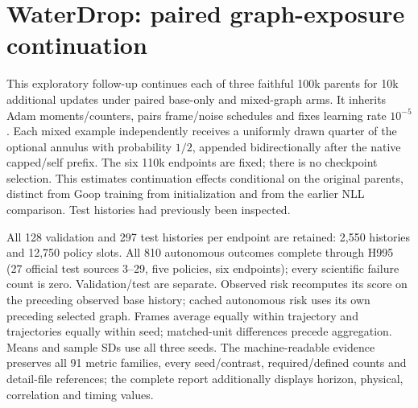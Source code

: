 \section{WaterDrop: paired graph-exposure continuation}
\label{sec:waterdrop-110k-exposure}
This exploratory follow-up continues each of three faithful 100k parents for 10k additional updates under paired base-only and mixed-graph arms. It inherits Adam moments/counters, pairs frame/noise schedules and fixes learning rate $10^{-5}$. Each mixed example independently receives a uniformly drawn quarter of the optional annulus with probability $1/2$, appended bidirectionally after the native capped/self prefix. The six 110k endpoints are fixed; there is no checkpoint selection. This estimates continuation effects conditional on the original parents, distinct from Goop training from initialization and from the earlier NLL comparison. Test histories had previously been inspected.

All 128 validation and 297 test histories per endpoint are retained: 2,550 histories and 12,750 policy slots. All 810 autonomous outcomes complete through H995 (27 official test sources 3--29, five policies, six endpoints); every scientific failure count is zero. Validation/test are separate. Observed risk recomputes its score on the preceding observed base history; cached autonomous risk uses its own preceding selected graph. Frames average equally within trajectory and trajectories equally within seed; matched-unit differences precede aggregation. Means and sample SDs use all three seeds. The machine-readable evidence preserves all 91 metric families, every seed/contrast, required/defined counts and detail-file references; the complete report additionally displays horizon, physical, correlation and timing values.


